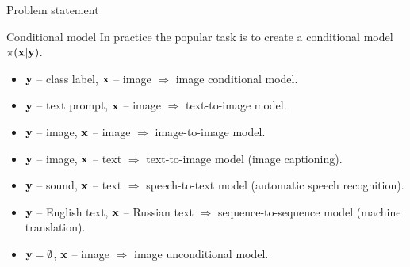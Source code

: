 \begin{frame}{Problem statement}
	\begin{block}{Conditional model}
		In practice the popular task is to create a conditional model~$\pi(\mathbf{x} | \mathbf{y})$. 
		\begin{itemize}
		\item $\mathbf{y}$ -- class label, $\mathbf{x}$ -- image $\Rightarrow$ image conditional model.
		\item $\mathbf{y}$ -- text prompt, $\mathbf{x}$ -- image $\Rightarrow$ text-to-image model.
		\item $\mathbf{y}$ -- image, $\mathbf{x}$ -- image $\Rightarrow$ image-to-image model.
		\item $\mathbf{y}$ -- image, $\mathbf{x}$ -- text $\Rightarrow$ text-to-image model (image captioning).
		\item $\mathbf{y}$ -- sound, $\mathbf{x}$ -- text $\Rightarrow$ speech-to-text model (automatic speech recognition).
		\item $\mathbf{y}$ -- English text, $\mathbf{x}$ -- Russian text $\Rightarrow$ sequence-to-sequence model (machine translation).
		\item $\mathbf{y} = \emptyset$, $\mathbf{x}$ -- image $\Rightarrow$ image unconditional model.
		\end{itemize}
	\end{block}
\end{frame}
